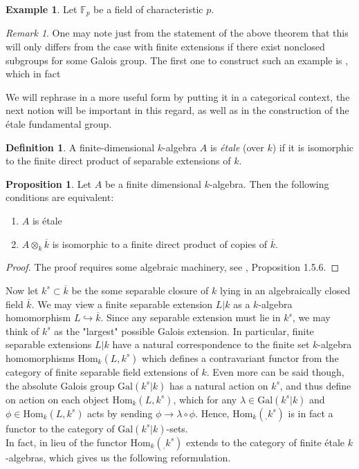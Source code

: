 \documentclass{article}
\theoremstyle{definition}
\newtheorem{proposition}[theorem]{Proposition}
\newtheorem{definition}[theorem]{Definition}
\newtheorem{example}[theorem]{Example}
\theoremstyle{remark}
\newtheorem*{remark}{Remark}
\begin{document}
\begin{example}
	Let $\mathbb{F}_p$ be a field of characteristic $p$.


\end{example}


\begin{remark}
	One may note just from the statement of the above theorem that this will only differs from the case with finite extensions if there exist nonclosed subgroups for some Galois group.
	The first one to construct such an example is , which in fact 
\end{remark}

We will rephrase  in a more useful form by putting it in a categorical context, the next notion will be important in this regard, as well as in the construction of the \'etale fundamental group.

\begin{definition} 
	A finite-dimensional $k$-algebra $A$ is \textit{\'etale} (over $k$) if it is isomorphic to the finite direct product of separable extensions of $k$.
\end{definition}

\begin{proposition} 
	Let $A$ be a finite dimensional $k$-algebra.
	Then the following conditions are equivalent:
	\begin{enumerate}
		\item $A$ is \'etale
		\item $A \otimes_k \overline{k}$ is isomorphic to a finite direct product of copies of $\overline{k}$.
	\end{enumerate}
\end{proposition}
\begin{proof}
	The proof requires some algebraic machinery, see \cite{Szamuely}, Proposition 1.5.6.
\end{proof}

Now let $k^s \subset \overline{k}$ be the some separable closure of $k$ lying in an algebraically closed field $\overline{k}$.
We may view a finite separable extension $L|k$ as a $k$-algebra homomorphism $L \hookrightarrow \overline{k}$. Since any separable extension must lie in $k^s$, we may think of $k^s$ as the "largest" possible Galois extension.
In particular, finite separable extensions $L|k$ have a natural correspondence to the finite set $k$-algebra homomorphisms $\text{Hom}_k(L, k^s)$
 which defines a contravariant functor from the category of finite separable field extensions of $k$.
 Even more can be said though, the absolute Galois group $\text{Gal}(k^s|k)$ has a natural action on $k^s$, and thus define on action on each object $\text{Hom}_k(L, k^s)$, which for any $\lambda \in \text{Gal}(k^s|k)$ and $\phi \in \text{Hom}_k(L, k^s)$ acts by sending $\phi \to \lambda \circ \phi$.
 Hence, $\text{Hom}_k(_, k^s)$ is in fact a functor to the category of $\text{Gal}(k^s|k)$-sets.\\
\indent In fact, in lieu of  the functor $\text{Hom}_k(_,k^s)$ extends to the category of finite \'etale $k$-algebras, which gives us the following reformulation.
\end{document}
